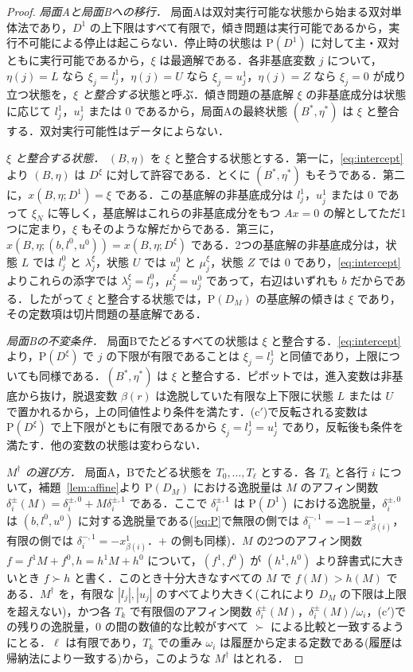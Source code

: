 \documentclass[11pt,a4paper]{ltjsarticle}
\theoremstyle{plain}
\theoremstyle{definition}
\theoremstyle{remark}
\newcommand{\Pb}{\mathrm{P}}
\begin{document}
\begin{proof}
\emph{局面Aと局面Bへの移行．} 局面Aは双対実行可能な状態から始まる双対単体法であり，$D^1$ の上下限はすべて有限で，傾き問題は実行可能であるから，実行不可能による停止は起こらない．停止時の状態は $\Pb(D^1)$ に対して主・双対ともに実行可能であるから，$\xi$ は最適解である．各非基底変数 $j$ について，$\eta(j)=L$ なら $\xi_j=l^1_j$，$\eta(j)=U$ なら $\xi_j=u^1_j$，$\eta(j)=Z$ なら $\xi_j=0$ が成り立つ状態を，\emph{$\xi$ と整合する}状態と呼ぶ．傾き問題の基底解 $\xi$ の非基底成分は状態に応じて $l^1_j$，$u^1_j$ または $0$ であるから，局面Aの最終状態 $(B^\ast,\eta^\ast)$ は $\xi$ と整合する．双対実行可能性はデータによらない．

\emph{$\xi$ と整合する状態．} $(B,\eta)$ を $\xi$ と整合する状態とする．第一に，\eqref{eq:intercept}より $(B,\eta)$ は $D^\xi$ に対して許容である．とくに $(B^\ast,\eta^\ast)$ もそうである．第二に，$x(B,\eta;D^1)=\xi$ である．この基底解の非基底成分は $l^1_j$，$u^1_j$ または $0$ であって $\xi_N$ に等しく，基底解はこれらの非基底成分をもつ $Ax=0$ の解としてただ1つに定まり，$\xi$ もそのような解だからである．第三に，$x(B,\eta;(b,l^0,u^0))=x(B,\eta;D^\xi)$ である．2つの基底解の非基底成分は，状態 $L$ では $l^0_j$ と $\lambda^\xi_j$，状態 $U$ では $u^0_j$ と $\mu^\xi_j$，状態 $Z$ では $0$ であり，\eqref{eq:intercept}よりこれらの添字では $\lambda^\xi_j=l^0_j$，$\mu^\xi_j=u^0_j$ であって，右辺はいずれも $b$ だからである．したがって $\xi$ と整合する状態では，$\Pb(D_M)$ の基底解の傾きは $\xi$ であり，その定数項は切片問題の基底解である．

\emph{局面Bの不変条件．} 局面Bでたどるすべての状態は $\xi$ と整合する．\eqref{eq:intercept}より，$\Pb(D^\xi)$ で $j$ の下限が有限であることは $\xi_j=l^1_j$ と同値であり，上限についても同様である．$(B^\ast,\eta^\ast)$ は $\xi$ と整合する．ピボットでは，進入変数は非基底から抜け，脱退変数 $\beta(r)$ は逸脱していた有限な上下限に状態 $L$ または $U$ で置かれるから，上の同値性より条件を満たす．(c$'$)で反転される変数は $\Pb(D^\xi)$ で上下限がともに有限であるから $\xi_j=l^1_j=u^1_j$ であり，反転後も条件を満たす．他の変数の状態は変わらない．

\emph{$M^\dagger$ の選び方．} 局面A，Bでたどる状態を $T_0,\dots,T_\ell$ とする．各 $T_k$ と各行 $i$ について，補題~\ref{lem:affine}より $\Pb(D_M)$ における逸脱量は $M$ のアフィン関数 $\delta_i^\pm(M)=\delta_i^{\pm,0}+M\delta_i^{\pm,1}$ である．ここで $\delta^{\pm,1}_i$ は $\Pb(D^1)$ における逸脱量，$\delta^{\pm,0}_i$ は $(b,l^0,u^0)$ に対する逸脱量である(\eqref{eq:P}で無限の側では $\delta^{-,1}_i=-1-x^1_{\beta(i)}$，有限の側では $\delta^{-,1}_i=-x^1_{\beta(i)}$．$+$ の側も同様)．$M$ の2つのアフィン関数 $f=f^1M + f^0,h=h^1M + h^0$ について，$(f^1,f^0)$ が $(h^1,h^0)$ より辞書式に大きいとき $f\succ h$ と書く．このとき十分大きなすべての $M$ で $f(M)>h(M)$ である．$M^\dagger$ を，有限な $|l_j|,|u_j|$ のすべてより大きく(これにより $D_M$ の下限は上限を超えない)，かつ各 $T_k$ で有限個のアフィン関数 $\delta_i^\pm(M)$，$\delta_i^\pm(M)/\omega_i$，(c$'$)での残りの逸脱量，$0$ の間の数値的な比較がすべて $\succ$ による比較と一致するようにとる．$\ell$ は有限であり，$T_k$ での重み $\omega_i$ は履歴から定まる定数である(履歴は帰納法により一致する)から，このような $M^\dagger$ はとれる．


\end{proof}
\end{document}
